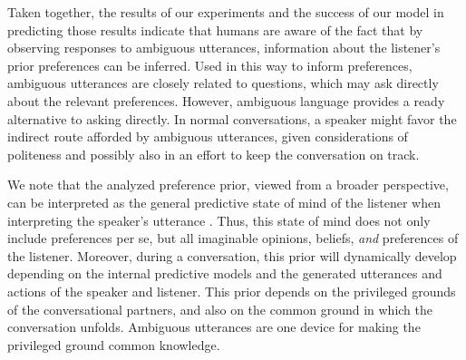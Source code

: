 \documentclass[10pt,a4paper]{article}
\begin{document}
Taken together, the results of our experiments and the success of our model in predicting those results indicate that humans are aware of the fact that by observing responses to ambiguous utterances, information about the listener's prior preferences can be inferred. 
Used in this way to inform preferences, ambiguous utterances are closely related to questions, which may ask directly about the  relevant preferences. 
However, ambiguous language provides a ready alternative to asking directly. In normal conversations, a speaker might favor the indirect route afforded by ambiguous utterances, given considerations of politeness and possibly also in an effort to keep the conversation on track.  

We note that the analyzed preference prior, viewed from a broader perspective, can be interpreted as the general predictive state of mind of the listener when interpreting the speaker's utterance \cite{Butz:2017}. 
Thus, this state of mind does not only include preferences per se, but all imaginable opinions, beliefs, \emph{and} preferences of the listener. 
Moreover, during a conversation, this prior will dynamically develop depending on the internal predictive models and the generated utterances and actions of the speaker and listener. This prior depends on the privileged grounds of the conversational partners, and also on the common ground in which the conversation unfolds. Ambiguous utterances are one device for making the privileged ground common knowledge. 




\setlength{\bibleftmargin}{.125in}
\setlength{\bibindent}{-\bibleftmargin}


\end{document}
